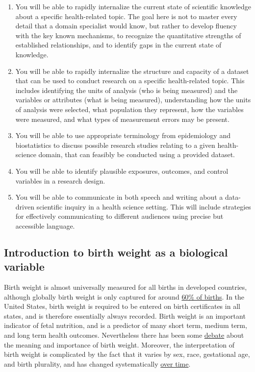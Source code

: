 \begin{enumerate}

\item You will be able to rapidly internalize the current state of scientific knowledge about a specific health-related topic. The goal here is not to master every detail that a domain specialist would know, but rather to develop fluency with the key known mechanisms, to recognize the quantitative strengths of established relationships, and to identify gaps in the current state of knowledge.
\item You will be able to rapidly internalize the structure and capacity of a dataset that can be used to conduct research on a specific health-related topic. This includes identifying the units of analysis (who is being measured) and the variables or attributes (what is being measured), understanding how the units of analysis were selected, what population they represent, how the variables were measured, and what types of measurement errors may be present.

\item You will be able to use appropriate terminology from epidemiology and biostatistics to discuss possible research studies relating to a given health-science domain, that can feasibly be conducted using a provided dataset.

\item You will be able to identify plausible exposures, outcomes, and control variables in a research design.

\item You will be able to communicate in both speech and writing about a data-driven scientific inquiry in a health science setting. This will include strategies for effectively communicating to different audiences using precise but accessible language.

\end{enumerate}

\subsection{Introduction to birth weight as a biological variable}

Birth weight is almost universally measured for all births in developed countries, although globally birth weight is only captured for around \href{https://pubmed.ncbi.nlm.nih.gov/33557859}{60\% of births}.  In the United States, birth weight is required to be entered on birth certificates in all states, and is therefore essentially always recorded.  Birth weight is an important indicator of fetal nutrition, and is a predictor of many short term, medium term, and long term health outcomes.  Nevertheless there has been some \href{https://pubmed.ncbi.nlm.nih.gov/11821313}{debate} about the meaning and importance of birth weight.  Moreover, the interpretation of birth weight is complicated by the fact that it varies by sex, race, gestational age, and birth plurality, and has changed systematically \href{https://www.ajog.org/article/S0002-9378(24)00431-9/fulltext}{over time}.

